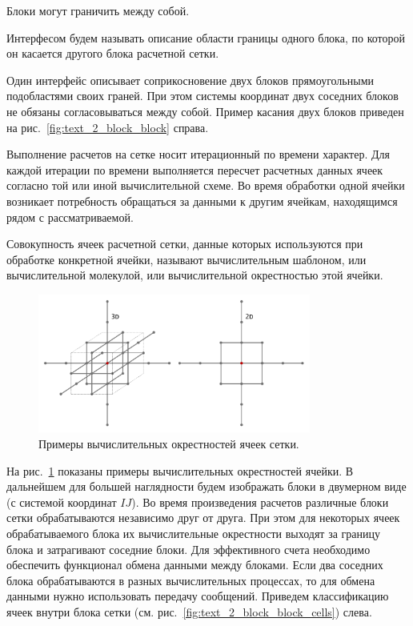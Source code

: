 Блоки могут граничить между собой.

\begin{definition}
Интерфесом будем называть описание области границы одного блока, по которой он касается другого блока расчетной сетки.
\end{definition}

Один интерфейс описывает соприкосновение двух блоков прямоугольными подобластями своих граней.
При этом системы координат двух соседних блоков не обязаны согласовываться между собой.
Пример касания двух блоков приведен на рис.~\ref{fig:text_2_block_block} справа.

Выполнение расчетов на сетке носит итерационный по времени характер.
Для каждой итерации по времени выполняется пересчет расчетных данных ячеек согласно той или иной вычислительной схеме.
Во время обработки одной ячейки возникает потребность обращаться за данными к другим ячейкам, находящимся рядом с рассматриваемой.

\begin{definition}
Совокупность ячеек расчетной сетки, данные которых используются при обработке конкретной ячейки, называют вычислительным шаблоном, или вычислительной молекулой, или вычислительной окрестностью этой ячейки.
\end{definition}

\begin{figure}[ht]
\centering
\includegraphics[width=0.8\textwidth]{fig/par_3-cell-delta.pdf}
\singlespacing
{}\caption{Примеры вычислительных окрестностей ячеек сетки.}
\label{fig:text_2_block_cell_delta}
\end{figure}

На рис.~\ref{fig:text_2_block_cell_delta} показаны примеры вычислительных окрестностей ячейки.
В дальнейшем для большей наглядности будем изображать блоки в двумерном виде (с системой координат $IJ$).
Во время произведения расчетов различные блоки сетки обрабатываются независимо друг от друга.
При этом для некоторых ячеек обрабатываемого блока их вычислительные окрестности выходят за границу блока и затрагивают соседние блоки.
Для эффективного счета необходимо обеспечить функционал обмена данными между блоками.
Если два соседних блока обрабатываются в разных вычислительных процессах, то для обмена данными нужно использовать передачу сообщений.
Приведем классификацию ячеек внутри блока сетки (см. рис.~\ref{fig:text_2_block_block_cells}) слева.

